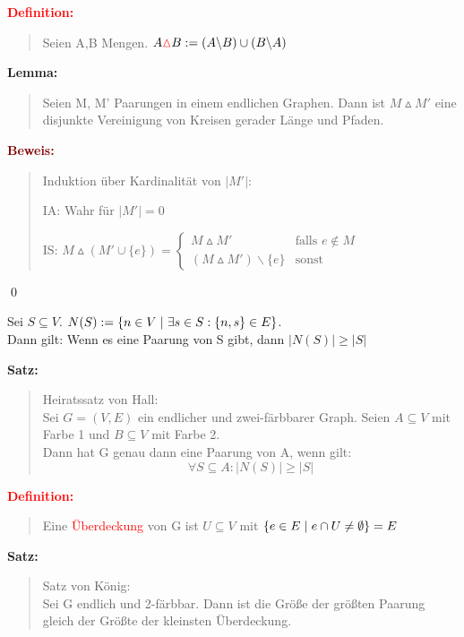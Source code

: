 \documentclass{article}
\newcommand{\smsp}{\phantom{\hspace{3px}}}
\newcommand{\red}[1]{\textcolor{red}{#1}}
\newcommand{\dgr}[1]{\textcolor{dgr}{#1}}
\newcommand{\maroon}[1]{\textcolor{maroon}{#1}}
\newcommand{\de}[1]{\red{\textbf{Definition: }}\begin{quote}#1\end{quote}}
\newcommand{\se}[1]{\dgr{\textbf{Satz: }}\begin{quote}#1\end{quote}}
\newcommand{\lem}[1]{\dgr{\textbf{Lemma: }}\begin{quote}#1\end{quote}}
\newcommand{\pr}[1]{\maroon{\textbf{Beweis: }}\begin{quote}#1\end{quote}\qed}
\renewcommand{\st}{\smsp | \smsp}
\newcommand{\xor}{\mathbin{\vartriangle}}
\begin{document}
\de{
    Seien A,B Mengen. $A \red{\xor} B := (A \backslash B) \cup (B \backslash A)$
}

\lem{
    Seien M, M' Paarungen in einem endlichen Graphen. Dann ist $M \xor M'$ eine disjunkte Vereinigung von Kreisen gerader Länge und Pfaden.
}
\pr{
    Induktion über Kardinalität von $|M'|$:

    IA: Wahr für $|M'| = 0$

    IS: $M \xor (M' \cup \{e\}) = \begin{cases}
        M \xor M' & \text{falls $e \notin M$}\\
        (M \xor M') \backslash \{e\} & \text{sonst}
    \end{cases}$
}

Sei $S \subseteq V$. $N(S) := \{n \in V \st \exists s \in S: \{n,s\} \in E\}$.\\
Dann gilt: Wenn es eine Paarung von S gibt, dann $|N(S)| \ge |S|$

\se{
    Heiratssatz von Hall:\\
    Sei $G=(V,E)$ ein endlicher und zwei-färbbarer Graph. Seien $A \subseteq V$ mit Farbe 1 und $B \subseteq V$ mit Farbe 2.\\
    Dann hat G genau dann eine Paarung von A, wenn gilt:
    \[
        \forall S \subseteq A: |N(S)| \ge |S|   
    \]
}

\de{
    Eine \red{Überdeckung} von G ist $U \subseteq V$ mit $\{e \in E \st e \cap U \ne \emptyset\} = E$
}

\se{
    Satz von König:\\
    Sei G endlich und 2-färbbar. Dann ist die Größe der größten Paarung gleich der Größte der kleinsten Überdeckung.
}
\end{document}
